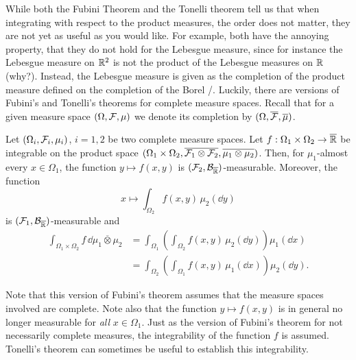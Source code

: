 While both the Fubini Theorem and the Tonelli theorem tell us that when integrating with respect to the product measures, the order does not matter, they are not yet as useful as you would like. For example, both have the annoying property, that they do not hold for the Lebesgue measure, since for instance the Lebesgue measure on $\mathbb R^2$ is not the product of the Lebesgue measures on $\mathbb R$ (why?). Instead, the Lebesgue measure is given as the completion of the product measure defined on the completion of the Borel \sigalg/. Luckily, there are versions of Fubini's and Tonelli's theorems for complete measure spaces. Recall that for a given measure space $(\Omega, \mathcal F, \mu)$ we denote its completion by $(\Omega, \overline{\mathcal F}, \overline{\mu})$.

\begin{theorem}
Let $(\Omega_i, \mathcal F_i, \mu_i)$, $i=1,2$ be two complete measure spaces. 
Let $f : \Omega_1 \times \Omega_2 \to \overline{\mathbb R}$ be integrable on the product space $(\Omega_1 \times \Omega_2, \overline{\mathcal F_1 \otimes \mathcal F_2}, \overline{\mu_1 \otimes \mu_2})$. Then, for $\mu_1$-almost every $x \in \Omega_1$, the function $y \mapsto f(x, y)$ is $(\mathcal F_2,\mathcal B_{\overline{\mathbb R}})$-measurable. Moreover, the function 
\[
x \mapsto \int_{\Omega_2} f(x,y)\, \mu_2(\dd y)
\]
is $(\mathcal F_1,\mathcal B_{\overline{\mathbb R}})$-measurable and
\[
\begin{split}
\int_{\Omega_1 \times \Omega_2} f\, \dd \overline{\mu_1 \otimes \mu_2} 
&= \int_{\Omega_1} \left( \int_{\Omega_2 } f(x,  y ) \,\mu_2(\dd y) \right) \mu_1(\dd x)\\
&= \int_{\Omega_2} \left( \int_{\Omega_1} f(x, y) \,\mu_1(\dd x) \right) \mu_2(\dd y).
\end{split}
\] 	
\end{theorem}

Note that this version of Fubini's theorem assumes that the measure spaces involved are complete. 
Note also that the function $y \mapsto f(x,y)$ is in general no longer measurable for \emph{all} $x \in \Omega_1$. Just as the version of Fubini's theorem for not necessarily complete measures, the integrability of the function $f$ is assumed. Tonelli's theorem can sometimes be useful to establish this integrability.

